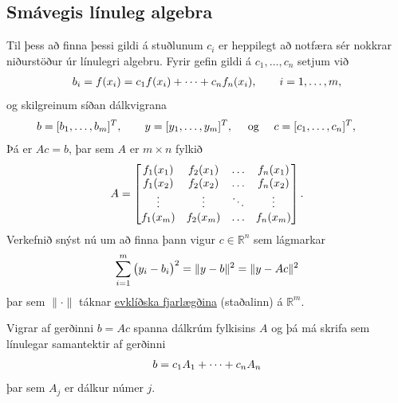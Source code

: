 \documentclass[letterpaper,10pt,icelandic]{sphinxmanual}
\begin{document}
\subsection{Smávegis línuleg algebra}
\label{kafli03:smavegis-linuleg-algebra}
Til þess að finna þessi gildi á stuðlunum \(c_i\) er heppilegt að
notfæra sér nokkrar niðurstöður úr línulegri algebru. Fyrir gefin gildi
á \(c_1,\dots,c_n\) setjum við
\begin{gather}
\begin{split}b_i = f(x_i) = c_1f(x_i) + \cdots + c_n f_n(x_i),
    \qquad i=1,\dots,m,\end{split}\notag
\end{gather}
og skilgreinum síðan dálkvigrana
\begin{gather}
\begin{split}b = [b_1,\dots,b_m]^T,\qquad
    y = [y_1,\dots,y_m]^T,\quad \text{ og } \quad
    c = [c_1,\dots,c_n]^T,\qquad\end{split}\notag
\end{gather}
Þá er \(Ac=b\), þar sem \(A\) er \(m\times n\) fylkið
\begin{gather}
\begin{split}A = \left[\begin{matrix}
        f_1(x_1)& f_2(x_1) & \dots & f_n(x_1) \\
        f_1(x_2)& f_2(x_2) & \dots & f_n(x_2) \\
        \vdots &\vdots &\ddots &\vdots \\
        f_1(x_m)& f_2(x_m) & \dots & f_n(x_m)
    \end{matrix}\right].\end{split}\notag
\end{gather}
Verkefnið snýst nú um að finna þann vigur \(c\in {{\mathbb  R}}^n\)
sem lágmarkar
\begin{gather}
\begin{split}\sum_{i=1}^m \big(y_i-b_i\big)^2
    = \| y - b \|^2 = \| y - Ac \|^2\end{split}\notag
\end{gather}
þar sem \(\|\cdot\|\) táknar \href{https://en.wikipedia.org/wiki/Euclidean\_distance}{evklíðska fjarlægðina}
(staðalinn) á \({{\mathbb  R}}^m\).

Vigrar af gerðinni \(b= Ac\) spanna dálkrúm fylkisins \(A\) og
þá má skrifa sem línulegar samantektir af gerðinni
\begin{gather}
\begin{split}b = c_1A_1 + \cdots + c_nA_n\end{split}\notag
\end{gather}
þar sem \(A_j\) er dálkur númer \(j\).
\end{document}
